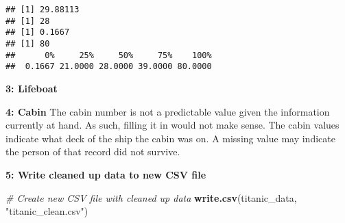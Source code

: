 \documentclass[]{article}
\newenvironment{Shaded}{\begin{snugshade}}{\end{snugshade}}
\newcommand{\KeywordTok}[1]{\textcolor[rgb]{0.13,0.29,0.53}{\textbf{#1}}}
\newcommand{\DataTypeTok}[1]{\textcolor[rgb]{0.13,0.29,0.53}{#1}}
\newcommand{\DecValTok}[1]{\textcolor[rgb]{0.00,0.00,0.81}{#1}}
\newcommand{\StringTok}[1]{\textcolor[rgb]{0.31,0.60,0.02}{#1}}
\newcommand{\CommentTok}[1]{\textcolor[rgb]{0.56,0.35,0.01}{\textit{#1}}}
\newcommand{\OperatorTok}[1]{\textcolor[rgb]{0.81,0.36,0.00}{\textbf{#1}}}
\newcommand{\NormalTok}[1]{#1}
\begin{document}
\begin{verbatim}
## [1] 29.88113
## [1] 28
## [1] 0.1667
## [1] 80
##      0%     25%     50%     75%    100% 
##  0.1667 21.0000 28.0000 39.0000 80.0000
\end{verbatim}

\textbf{3: Lifeboat}

\begin{Shaded}
\end{Shaded}

\textbf{4: Cabin} The cabin number is not a predictable value given the
information currently at hand. As such, filling it in would not make
sense. The cabin values indicate what deck of the ship the cabin was on.
A missing value may indicate the person of that record did not survive.

\begin{Shaded}
\end{Shaded}

\textbf{5: Write cleaned up data to new CSV file}

\begin{Shaded}
\begin{Highlighting}[]
\CommentTok{# Create new CSV file with cleaned up data}
\KeywordTok{write.csv}\NormalTok{(titanic_data, }\StringTok{"titanic_clean.csv"}\NormalTok{)}
\end{Highlighting}
\end{Shaded}
\end{document}
